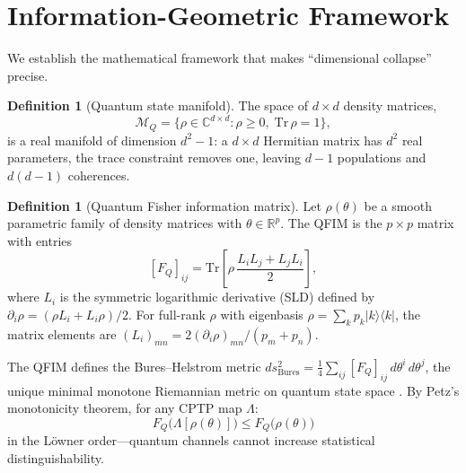 \documentclass[12pt,a4paper]{article}
\theoremstyle{definition}
\newtheorem{definition}[theorem]{Definition}
\theoremstyle{remark}
\begin{document}
\section{Information-Geometric Framework}
\label{sec:geometry}

We establish the mathematical framework that makes ``dimensional collapse'' precise.

\begin{definition}[Quantum state manifold]
\label{def:state-manifold}
The space of $d \times d$ density matrices,
\begin{equation}
\label{eq:state-manifold}
\mathcal{M}_Q = \bigl\{\rho \in \mathbb{C}^{d \times d} : \rho \geq 0,\; \mathrm{Tr}\,\rho = 1\bigr\},
\end{equation}
is a real manifold of dimension $d^2 - 1$: a $d \times d$ Hermitian matrix has $d^2$ real parameters, the trace constraint removes one, leaving $d - 1$ populations and $d(d{-}1)$ coherences.
\end{definition}

\begin{definition}[Quantum Fisher information matrix]
\label{def:qfim}
Let $\rho(\theta)$ be a smooth parametric family of density matrices with $\theta \in \mathbb{R}^p$. The QFIM is the $p \times p$ matrix with entries
\begin{equation}
\label{eq:qfim}
[F_Q]_{ij} = \mathrm{Tr}\!\left[\rho\,\frac{L_i L_j + L_j L_i}{2}\right],
\end{equation}
where $L_i$ is the symmetric logarithmic derivative (SLD) defined by $\partial_i \rho = (\rho L_i + L_i \rho)/2$. For full-rank $\rho$ with eigenbasis $\rho = \sum_k p_k |k\rangle\langle k|$, the matrix elements are $(L_i)_{mn} = 2(\partial_i \rho)_{mn}/(p_m + p_n)$.
\end{definition}

The QFIM defines the Bures--Helstrom metric $ds^2_{\mathrm{Bures}} = \frac{1}{4}\sum_{ij} [F_Q]_{ij}\, d\theta^i\, d\theta^j$, the unique minimal monotone Riemannian metric on quantum state space \cite{petz1996monotone,braunstein1994statistical}. By Petz's monotonicity theorem, for any CPTP map $\Lambda$:
\begin{equation}
\label{eq:dpi}
F_Q\bigl(\Lambda[\rho(\theta)]\bigr) \leq F_Q\bigl(\rho(\theta)\bigr)
\end{equation}
in the L\"owner order---quantum channels cannot increase statistical distinguishability.
\end{document}
